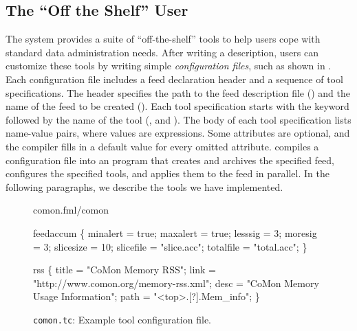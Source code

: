 \subsection{The ``Off the Shelf'' User}
\label{sec:tools}
The \padsd{} system provides a suite of ``off-the-shelf'' tools to
help users cope with standard data administration needs.  After writing
a \padsd{} description, users can customize these tools by
writing simple {\em configuration files}, such as shown in
.   
Each configuration file includes a feed declaration header 
and a sequence of tool specifications. The header specifies the path to the 
feed description file () and the name of the feed to be created ().
Each tool specification starts with the keyword  followed by the
name of the tool (\eg{},  and ). The body of each tool specification 
lists name-value pairs, where values are \ocaml{} expressions. Some attributes are 
optional, and the compiler fills in a default value for every omitted attribute.
\padsd{} compiles a configuration file into an \ocaml{} program that creates and archives the specified 
feed, configures the specified tools, and applies them to the feed in parallel.
In the following paragraphs, we describe the tools we have implemented.

\begin{figure}[t]
\centering
\begin{codebox}
 comon.fml/comon

 feedaccum
\{
  minalert  = true;
  maxalert  = true;
  lesssig   = 3;
  moresig   = 3;
  slicesize = 10;
  slicefile = "slice.acc";
  totalfile = "total.acc";
\}

 rss
\{
  title = "CoMon Memory RSS";
  link  = "http://www.comon.org/memory-rss.xml";
  desc  = "CoMon Memory Usage Information";
  path  = "<top>.[?].Mem_info";
\}
\end{codebox}
\caption{\texttt{comon.tc}: Example tool configuration file.}
\label{fig:toolconfigs}
\end{figure}






